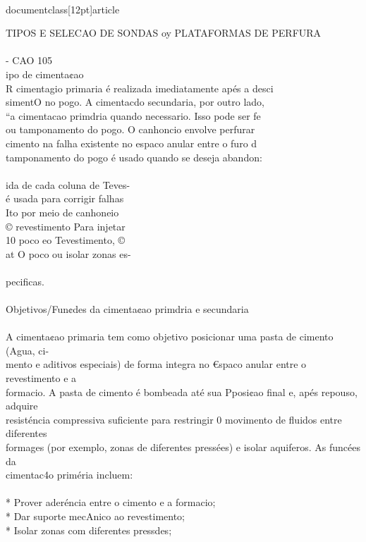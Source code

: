 \\documentclass[12pt]{article}
\begin{document}
TIPOS E SELECAO DE SONDAS oy PLATAFORMAS DE PERFURA\\
\\
- CAO 105\\
ipo de cimenta¢ao\\
R cimentagio primaria é realizada imediatamente apés a desci\\
simentO no pogo. A cimentacdo secundaria, por outro lado,\\
“a cimentacao primdria quando necessario. Isso pode ser fe\\
ou tamponamento do pogo. O canhoncio envolve perfurar\\
cimento na falha existente no espaco anular entre o furo d\\
tamponamento do pogo é usado quando se deseja abandon:\\
\\
ida de cada coluna de Teves-\\
é usada para corrigir falhas\\
Ito por meio de canhoneio\\
© revestimento Para injetar\\
10 poco eo Tevestimento, ©\\
at O poco ou isolar zonas es-\\
\\
pecificas.\\
\\
Objetivos/Fun¢des da cimenta¢ao primdria e secundaria\\
\\
A cimenta¢ao primaria tem como objetivo posicionar uma pasta de cimento (Agua, ci-\\
mento e aditivos especiais) de forma integra no €spaco anular entre o revestimento e a\\
formacio. A pasta de cimento é bombeada até sua Pposi¢ao final e, apés repouso, adquire\\
resisténcia compressiva suficiente para restringir 0 movimento de fluidos entre diferentes\\
formages (por exemplo, zonas de diferentes pressées) e isolar aquiferos. As funcées da\\
cimentac4o priméria incluem:\\
\\
* Prover aderéncia entre o cimento e a formacio;\\
* Dar suporte mecAnico ao revestimento;\\
* Isolar zonas com diferentes pressdes;\\
\end{document}
